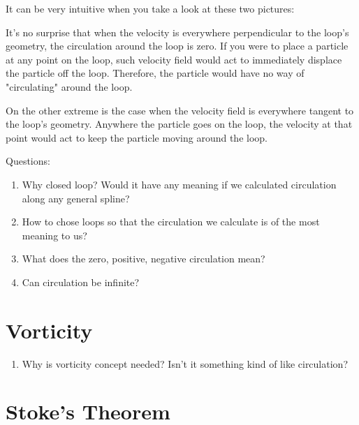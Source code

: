 \documentclass[8pt, twocolumn]{extarticle}
\begin{document}
It can be very intuitive when you take a look at these two pictures:



It's no surprise that when the velocity is everywhere perpendicular to the loop's geometry, the circulation around the loop is zero. If you were to place a particle at any point on the loop, such velocity field would act to immediately displace the particle off the loop. Therefore, the particle would have no way of "circulating" around the loop.

On the other extreme is the case when the velocity field is everywhere tangent to the loop's geometry. Anywhere the particle goes on the loop, the velocity at that point would act to keep the particle moving around the loop.

Questions:

\begin{enumerate}
\item Why closed loop? Would it have any meaning if we calculated circulation along any general spline?

\item How to chose loops so that the circulation we calculate is of the most meaning to us?

\item What does the zero, positive, negative circulation mean?

\item Can circulation be infinite?
\end{enumerate}


\section{Vorticity}


\begin{enumerate}
\item Why is vorticity concept needed? Isn't it something kind of like circulation?

\end{enumerate}




\section{Stoke's Theorem}


\newpage

\begin{thebibliography}{50}



\end{thebibliography}
\end{document}
